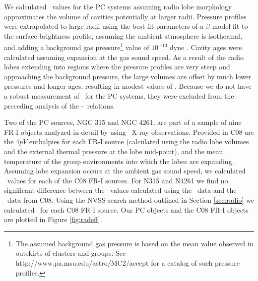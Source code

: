 \documentclass{emulateapj}
\begin{document}
We calculated \pcav\ values for the PC systems assuming radio lobe
morphology approximates the volume of cavities potentially at larger
radii. Pressure profiles were extrapolated to large radii using the
best-fit parameters of a $\beta$-model \citep{betamodel} fit to the
surface brightness profile, assuming the ambient atmosphere is
isothermal, and adding a background gas pressure\footnote{The assumed
  background gas pressure is based on the mean value observed in
  outskirts of clusters and groups. See
  http://www.pa.msu.edu/astro/MC2/accept for a catalog of such
  pressure profiles.} value of $10^{-13}$ dyne \pcmsq. Cavity ages
were calculated assuming expansion at the gas sound speed. As a result
of the radio lobes extending into regions where the pressure profiles
are very steep and approaching the background pressure, the large
volumes are offset by much lower pressures and longer ages, resulting
in modest values of \pcav. Because we do not have a robust measurement
of \pcav\ for the PC systems, they were excluded from the preceding
analysis of the \pjet-\prad\ relations.

Two of the PC sources, NGC 315 and NGC 4261, are part of a sample of
nine FR-I objects analyzed in detail by \citet[][hereafter
  C08]{2008MNRAS.386.1709C} using \xmm\ X-ray observations. Provided
in C08 are the $4pV$ enthalpies for each FR-I source (calculated using
the radio lobe volumes and the external thermal pressure at the lobe
mid-point), and the mean temperature of the group environments into
which the lobes are expanding. Assuming lobe expansion occurs at the
ambient gas sound speed, we calculated \pcav\ values for each of the
C08 FR-I sources. For N315 and N4261 we find no significant difference
between the \pcav\ values calculated using the \chandra\ data and the
\xmm\ data from C08. Using the NVSS search method outlined in Section
\ref{sec:radio} we calculated \phigh\ for each C08 FR-I source. Our PC
objects and the C08 FR-I objects are plotted in Figure
\ref{fig:radeff}.
\end{document}
